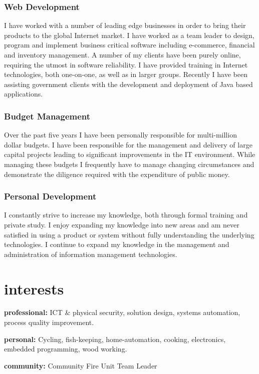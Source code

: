 \documentclass[]{friggeri-cv} %
\begin{document}
\subsubsection*{Web Development}
I have worked with a number of leading edge businesses in order to bring their products to the global Internet market. I have worked as a team leader to design, program and implement business critical software including e-commerce, financial and inventory management. A number of my clients have been purely online, requiring the utmost in software reliability. I have provided training in Internet technologies, both one-on-one, as well as in larger groups. Recently I have been assisting government clients with the development and deployment of Java based applications.

\subsubsection*{Budget Management}
Over the past five years I have been personally responsible for multi-million dollar budgets. I have been responsible for the management and delivery of large capital projects leading to significant improvements in the IT environment. While managing these budgets I frequently have to manage changing circumstances and demonstrate the diligence required with the expenditure of public money.

\subsubsection*{Personal Development}
I constantly strive to increase my knowledge, both through formal training and private study. I enjoy expanding my knowledge into new areas and am never satisfied in using a product or system without fully understanding the underlying technologies. I continue to expand my knowledge in the management and administration of information management technologies.


\section{interests}

\textbf{professional:} ICT \& physical security, solution design, systems automation, process quality improvement.

\textbf{personal:} Cycling, fish-keeping, home-automation, cooking, electronics, embedded programming, wood working.

\textbf{community:} Community Fire Unit Team Leader

\end{document}
